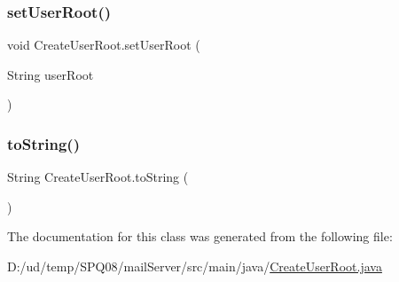 \subsubsection{\texorpdfstring{set\+User\+Root()}{setUserRoot()}}
{\footnotesize\ttfamily void Create\+User\+Root.\+set\+User\+Root (\begin{DoxyParamCaption}\item[{String}]{user\+Root }\end{DoxyParamCaption})}

\mbox{\label{class_create_user_root_a162c5272b7e633c81aca4077088eeccb}} 
\subsubsection{\texorpdfstring{to\+String()}{toString()}}
{\footnotesize\ttfamily String Create\+User\+Root.\+to\+String (\begin{DoxyParamCaption}{ }\end{DoxyParamCaption})}



The documentation for this class was generated from the following file\+:\begin{DoxyCompactItemize}
\item 
D\+:/ud/temp/\+S\+P\+Q08/mail\+Server/src/main/java/\hyperlink{_create_user_root_8java}{Create\+User\+Root.\+java}\end{DoxyCompactItemize}

